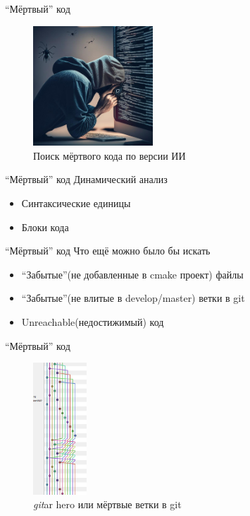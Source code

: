 \documentclass[aspectratio=169]{beamer}
\newcommand{\cmark}{\ding{51}}
\newcommand{\xmark}{\ding{55}}
\begin{document}
\begin{frame}{``Мёртвый'' код}
    \begin{figure}
        \includegraphics[width=0.4\textwidth]{memes/finding_dead_code.png}
        \caption{Поиск мёртвого кода по версии ИИ}
    \end{figure}
\end{frame}

\begin{frame}{``Мёртвый'' код}
    Динамический анализ
    \begin{itemize}
        \item[\xmark] Синтаксические единицы
        \item[\cmark] Блоки кода
    \end{itemize}
\end{frame}

\begin{frame}{``Мёртвый'' код}
    Что ещё можно было бы искать
    \begin{itemize}
        \item ``Забытые''(не добавленные в cmake проект) файлы
        \item ``Забытые''(не влитые в develop/master) ветки в git
        \item Unreachable(недостижимый) код
    \end{itemize}
\end{frame}

\begin{frame}{``Мёртвый'' код}
    \begin{figure}
        \includegraphics[width=0.18\textwidth]{memes/git.png}
        \caption{\textit{git}ar hero или мёртвые ветки в git}
    \end{figure}
\end{frame}
\end{document}
